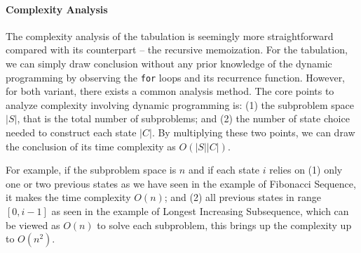 \documentclass[../main.tex]{subfiles}
\begin{document}
\paragraph{Complexity Analysis}
\label{sec_dp_complexity_analysis}
The complexity analysis of the tabulation is seemingly more straightforward compared with its counterpart -- the recursive memoization. For the tabulation, we can simply draw conclusion without any prior knowledge of the dynamic programming by observing the \texttt{for} loops and its recurrence function. However, for both variant, there exists a common analysis method. The core points to analyze complexity involving dynamic programming is: (1) the subproblem space $|S|$, that is the total number of subproblems; and (2) the number of state choice needed to construct each state $|C|$. By multiplying these two points, we can draw the conclusion of its time complexity as $O(|S||C|)$.

For example, if the subproblem space is $n$ and if each state $i$ relies on (1) only one or two previous states as we have seen in the example of Fibonacci Sequence, it makes the time complexity $O(n)$; and (2) all previous states in range $[0, i-1]$ as seen in the example of Longest Increasing Subsequence, which can be viewed as $O(n)$ to solve each subproblem, this brings up the complexity up to $O(n^2)$.
\end{document}
